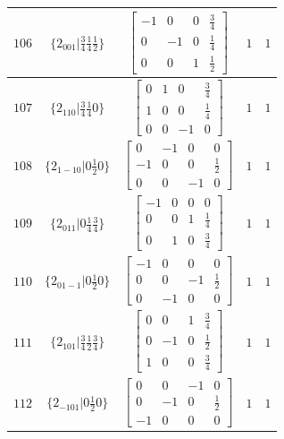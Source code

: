 \documentclass[fleqn,8pt]{jsarticle}
\begin{document}
\begin{longtable}{ccccc}
$ 106 $ & $ \{2{}_{001}|\frac{3}{4} \frac{1}{4} \frac{1}{2}\} $ & $ \begin{bmatrix} -1 & 0 & 0 & \frac{3}{4} \\ 0 & -1 & 0 & \frac{1}{4} \\ 0 & 0 & 1 & \frac{1}{2} \end{bmatrix} $ & $ 1 $ & $ 1 $ \\ \hline
$ 107 $ & $ \{2{}_{110}|\frac{3}{4} \frac{1}{4} 0\} $ & $ \begin{bmatrix} 0 & 1 & 0 & \frac{3}{4} \\ 1 & 0 & 0 & \frac{1}{4} \\ 0 & 0 & -1 & 0 \end{bmatrix} $ & $ 1 $ & $ 1 $ \\ \hline
$ 108 $ & $ \{2{}_{1-10}|0 \frac{1}{2} 0\} $ & $ \begin{bmatrix} 0 & -1 & 0 & 0 \\ -1 & 0 & 0 & \frac{1}{2} \\ 0 & 0 & -1 & 0 \end{bmatrix} $ & $ 1 $ & $ 1 $ \\ \hline
$ 109 $ & $ \{2{}_{011}|0 \frac{1}{4} \frac{3}{4}\} $ & $ \begin{bmatrix} -1 & 0 & 0 & 0 \\ 0 & 0 & 1 & \frac{1}{4} \\ 0 & 1 & 0 & \frac{3}{4} \end{bmatrix} $ & $ 1 $ & $ 1 $ \\ \hline
$ 110 $ & $ \{2{}_{01-1}|0 \frac{1}{2} 0\} $ & $ \begin{bmatrix} -1 & 0 & 0 & 0 \\ 0 & 0 & -1 & \frac{1}{2} \\ 0 & -1 & 0 & 0 \end{bmatrix} $ & $ 1 $ & $ 1 $ \\ \hline
$ 111 $ & $ \{2{}_{101}|\frac{3}{4} \frac{1}{2} \frac{3}{4}\} $ & $ \begin{bmatrix} 0 & 0 & 1 & \frac{3}{4} \\ 0 & -1 & 0 & \frac{1}{2} \\ 1 & 0 & 0 & \frac{3}{4} \end{bmatrix} $ & $ 1 $ & $ 1 $ \\ \hline
$ 112 $ & $ \{2{}_{-101}|0 \frac{1}{2} 0\} $ & $ \begin{bmatrix} 0 & 0 & -1 & 0 \\ 0 & -1 & 0 & \frac{1}{2} \\ -1 & 0 & 0 & 0 \end{bmatrix} $ & $ 1 $ & $ 1 $ \\ \hline

\end{longtable}
\end{document}
